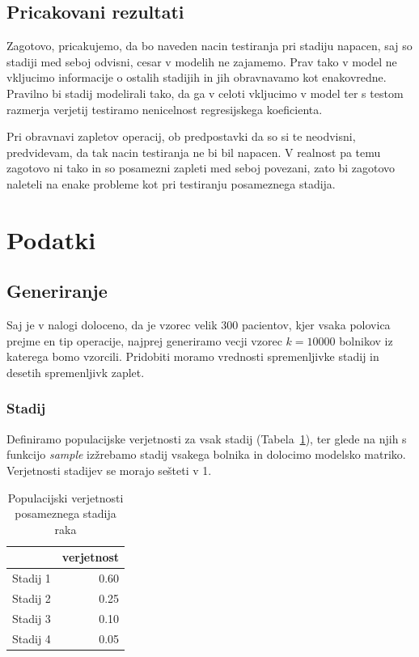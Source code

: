 \documentclass[letterpaper,11pt]{article}
\begin{document}
\subsection{Pricakovani rezultati}
Zagotovo, pricakujemo, da bo naveden nacin testiranja pri stadiju napacen, saj so stadiji med seboj odvisni, cesar v modelih ne zajamemo. Prav tako v model ne vkljucimo informacije o ostalih stadijih in jih obravnavamo kot enakovredne. Pravilno bi stadij modelirali tako,  da ga v celoti vkljucimo v model ter s testom razmerja verjetij testiramo nenicelnost regresijskega koeficienta.

\noindent Pri obravnavi zapletov operacij, ob predpostavki da so si te neodvisni, predvidevam, da tak nacin testiranja ne bi bil napacen. V realnost pa temu zagotovo ni tako in so posamezni zapleti med seboj povezani, zato bi zagotovo naleteli na enake probleme kot pri testiranju posameznega stadija.

\section{Podatki}
\subsection{Generiranje}
Saj je v nalogi doloceno, da je vzorec velik 300 pacientov, kjer vsaka polovica prejme en tip operacije, najprej generiramo vecji vzorec $k=10000$ bolnikov iz katerega bomo vzorcili. Pridobiti moramo vrednosti spremenljivke stadij in desetih spremenljivk zaplet.

\subsubsection{Stadij}
Definiramo populacijske verjetnosti za vsak stadij (Tabela~\ref{table:1}), ter glede na njih s funkcijo \emph{sample} izžrebamo stadij vsakega bolnika in dolocimo modelsko matriko. Verjetnosti stadijev se morajo sešteti v 1.

\begin{table}[ht]
\centering
\begin{tabular}{rr}
  \hline
 & verjetnost \\ 
  \hline
Stadij 1 & 0.60 \\ 
  Stadij 2 & 0.25 \\ 
  Stadij 3 & 0.10 \\ 
  Stadij 4 & 0.05 \\ 
   \hline
\end{tabular}
\caption{Populacijski verjetnosti posameznega stadija raka} 
\label{table:1}
\end{table}
\end{document}
